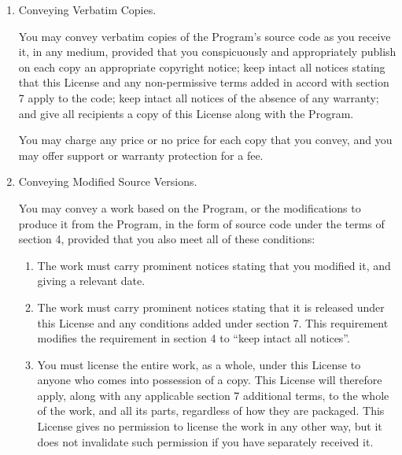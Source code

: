 \documentclass[10pt,a4paper,ngerman,titlepage,tocindentauto]{article}
\begin{document}
\begin{multicols}{3}
{\begin{enumerate}
						\item Conveying Verbatim Copies.

						You may convey verbatim copies of the Program's source code as you
						receive it, in any medium, provided that you conspicuously and
						appropriately publish on each copy an appropriate copyright notice;
						keep intact all notices stating that this License and any
						non-permissive terms added in accord with section 7 apply to the code;
						keep intact all notices of the absence of any warranty; and give all
						recipients a copy of this License along with the Program.

						You may charge any price or no price for each copy that you convey,
						and you may offer support or warranty protection for a fee.

						\item Conveying Modified Source Versions.

						You may convey a work based on the Program, or the modifications to
						produce it from the Program, in the form of source code under the
						terms of section 4, provided that you also meet all of these conditions:
						  \begin{enumerate}
						  \item The work must carry prominent notices stating that you modified
						  it, and giving a relevant date.

						  \item The work must carry prominent notices stating that it is
						  released under this License and any conditions added under section
						  7.  This requirement modifies the requirement in section 4 to
						  ``keep intact all notices''.

						  \item You must license the entire work, as a whole, under this
						  License to anyone who comes into possession of a copy.  This
						  License will therefore apply, along with any applicable section 7
						  additional terms, to the whole of the work, and all its parts,
						  regardless of how they are packaged.  This License gives no
						  permission to license the work in any other way, but it does not
						  invalidate such permission if you have separately received it.


\end{enumerate}
\end{enumerate}}
\end{multicols}
\end{document}
